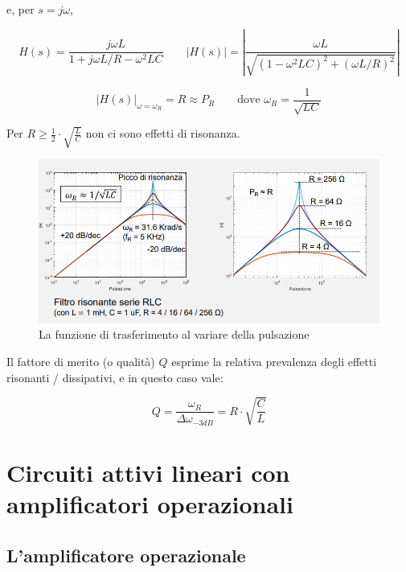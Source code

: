 \documentclass{article}
\begin{document}
e, per $s = j\omega$, 

\[H(s) = \frac{j \omega L}{1 + j \omega L/R - \omega ^2 LC} \quad \quad |H(s)| = \left| \frac{\omega L}{\sqrt{(1 - \omega ^2 LC)^2 + (\omega L/R)^2}} \right| \]

\[|H(s)|_{\omega = \omega_R} = R \approx P_R \quad \quad \textrm{dove } \omega _R = \frac{1}{\sqrt{LC}}\]

Per $R \geq \frac{1}{2} \cdot \sqrt{\frac{L}{C}}$ non ci sono effetti di risonanza.

\begin{figure}[h]
  \centering
  \includegraphics[scale=0.55]{IM_circuito_risonante_parallelo_RLC_grafici}
  \caption{La funzione di trasferimento al variare della pulsazione}
  \label{Schema_circuito_risonante_parallelo_RLC_grafici}
\end{figure}

Il fattore di merito (o qualità) $Q$ esprime la relativa prevalenza degli effetti risonanti / dissipativi, e in questo caso vale:

\[Q = \frac{\omega _R}{\Delta \omega _{-3dB}} = R \cdot \sqrt{\frac{C}{L}}\]


\clearpage










\section{Circuiti attivi lineari con amplificatori operazionali}

\subsection{L’amplificatore operazionale}
\end{document}

